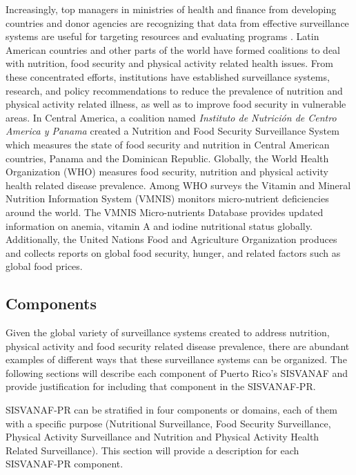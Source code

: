 \documentclass[12pt,letterpaper]{report}
\begin{document}
Increasingly, top managers in ministries of health and finance from developing countries and donor agencies are recognizing that data from effective surveillance systems are useful for targeting resources and evaluating programs \cite{jamison2006disease}. Latin American countries and other parts of the world have formed coalitions to deal with nutrition, food security and physical activity related health issues. From these concentrated efforts, institutions have established surveillance systems, research, and policy recommendations to reduce the prevalence of nutrition and physical activity related illness, as well as to improve food security in vulnerable areas. In Central America, a coalition named \textit{Instituto de Nutrici\'on de Centro America y Panama} created a Nutrition and Food Security Surveillance System which measures the state of food security and nutrition in Central American countries, Panama and the Dominican Republic. Globally, the World Health Organization (WHO) measures food security, nutrition and physical activity health related disease prevalence. Among WHO surveys the Vitamin and Mineral Nutrition Information System (VMNIS) monitors micro-nutrient deficiencies around the world. The VMNIS Micro-nutrients Database provides updated information on anemia, vitamin A and iodine nutritional status globally. Additionally, the United Nations Food and Agriculture Organization produces and collects reports on global food security, hunger, and related factors such as global food prices.

\subsection {Components}

Given the global variety of surveillance systems created to address nutrition, physical activity and food security related disease prevalence, there are abundant examples of different ways that these surveillance systems can be organized. The following sections will describe each component of Puerto Rico's SISVANAF and provide justification for including that component in the SISVANAF-PR. 

SISVANAF-PR can be stratified in four components or domains, each of them with a specific purpose (Nutritional Surveillance, Food Security Surveillance, Physical Activity Surveillance and Nutrition and Physical Activity Health Related Surveillance). This section will provide a description for each SISVANAF-PR component.
\end{document}
